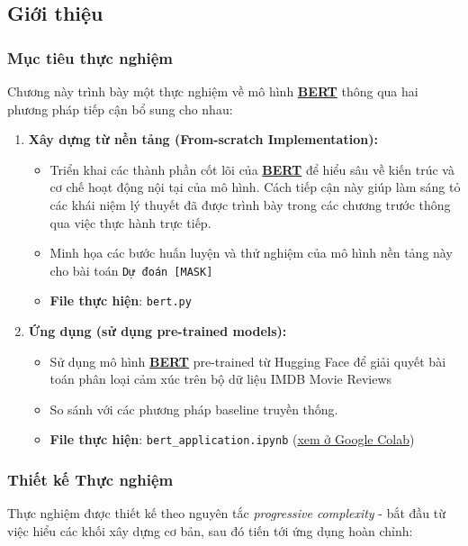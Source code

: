     \subsection{Giới thiệu}
    \label{ssec:gioi_thieu_dong_luc}
    
    \subsubsection{Mục tiêu thực nghiệm}
    Chương này trình bày một thực nghiệm về mô hình \hyperref[acro:bert]{\textbf{BERT}} thông qua hai phương pháp tiếp cận bổ sung cho nhau:
    
    \begin{enumerate}
        \item \textbf{Xây dựng từ nền tảng (From-scratch Implementation):} 
        \begin{itemize}
            \item Triển khai các thành phần cốt lõi của \hyperref[acro:bert]{\textbf{BERT}} để hiểu sâu về kiến trúc và cơ chế hoạt động nội tại của mô hình. Cách tiếp cận này giúp làm sáng tỏ các khái niệm lý thuyết đã được trình bày trong các chương trước thông qua việc thực hành trực tiếp. 
            \item Minh họa các bước huấn luyện và thử nghiệm của mô hình nền tảng này cho bài toán \texttt{Dự đoán [MASK]}
            \item \textbf{File thực hiện}: \texttt{bert.py}
        \end{itemize}
        \item \textbf{Ứng dụng (sử dụng pre-trained models):} 
        \begin{itemize}
            \item Sử dụng mô hình \hyperref[acro:bert]{\textbf{BERT}} pre-trained từ Hugging Face để giải quyết bài toán phân loại cảm xúc trên bộ dữ liệu IMDB Movie Reviews \cite{maas2011learning} 
            \item So sánh với các phương pháp baseline truyền thống.
            \item \textbf{File thực hiện}: \texttt{bert\_application.ipynb} (\href{https://colab.research.google.com/drive/1zA9fgGWFlxBlxHhLZLgE2NNVN0NPiT8y?usp=sharing}{xem ở Google Colab})
        \end{itemize}
    \end{enumerate}
    
    \subsubsection{Thiết kế Thực nghiệm}
    Thực nghiệm được thiết kế theo nguyên tắc \textit{progressive complexity} - bắt đầu từ việc hiểu các khối xây dựng cơ bản, sau đó tiến tới ứng dụng hoàn chỉnh:
    

